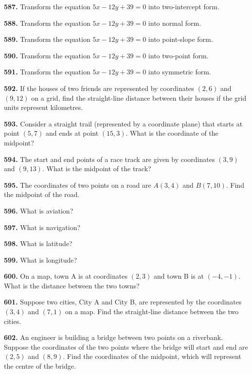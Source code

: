 \documentclass[11pt]{article}
\begin{document}
\bigskip
\noindent\textbf{587.} Transform the equation $5x-12y+39=0$ into two-intercept form.

\bigskip
\noindent\textbf{588.} Transform the equation $5x-12y+39=0$ into normal form.

\bigskip
\noindent\textbf{589.} Transform the equation $5x-12y+39=0$ into point-slope form.

\bigskip
\noindent\textbf{590.} Transform the equation $5x-12y+39=0$ into two-point form.

\bigskip
\noindent\textbf{591.} Transform the equation $5x-12y+39=0$ into symmetric form.

\bigskip
\noindent\textbf{592.} If the houses of two friends are represented by coordinates $(2,6)$ and $(9,12)$ on a grid, find the straight-line distance between their houses if the grid units represent kilometres.

\bigskip
\noindent\textbf{593.} Consider a straight trail (represented by a coordinate plane) that starts at point $(5,7)$ and ends at point $(15,3)$. What is the coordinate of the midpoint?

\bigskip
\noindent\textbf{594.} The start and end points of a race track are given by coordinates $(3,9)$ and $(9,13)$. What is the midpoint of the track?

\bigskip
\noindent\textbf{595.} The coordinates of two points on a road are $A(3,4)$ and $B(7,10)$. Find the midpoint of the road.

\bigskip
\noindent\textbf{596.} What is aviation?

\bigskip
\noindent\textbf{597.} What is navigation?

\bigskip
\noindent\textbf{598.} What is latitude?

\bigskip
\noindent\textbf{599.} What is longitude?

\bigskip
\noindent\textbf{600.} On a map, town A is at coordinates $(2,3)$ and town B is at $(-4,-1)$. What is the distance between the two towns?

\bigskip
\noindent\textbf{601.} Suppose two cities, City A and City B, are represented by the coordinates $(3,4)$ and $(7,1)$ on a map. Find the straight-line distance between the two cities.

\bigskip
\noindent\textbf{602.} An engineer is building a bridge between two points on a riverbank. Suppose the coordinates of the two points where the bridge will start and end are $(2,5)$ and $(8,9)$. Find the coordinates of the midpoint, which will represent the centre of the bridge.
\end{document}
